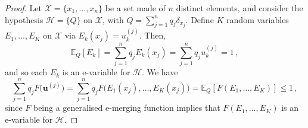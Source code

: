 \documentclass[10pt,a4paper]{amsart}
\newcommand{\E}{\mathbb E}
\newcommand{\Hh}{\mathcal H}
\newcommand{\X}{\mathcal X}
\begin{document}
\begin{proof}
    Let $\X = \{x_1,\dots, x_n\}$ be a  set made of $n$ distinct elements, and consider the hypothesis $\Hh = \{Q\}$ on $\X$, with $Q = \sum_{j=1}^n q_j \delta_{x_j}$. Define $K$ random variables $E_1,\dots, E_K$ on $\X$ via $E_k(x_j) = u^{(j)}_k$. Then, 
    $$\E_Q[E_k] = \sum_{j=1}^n q_j E_k(x_j) = \sum_{j=1}^n q_j u^{(j)}_k = 1\,,$$ and so each $E_k$ is an e-variable for $\Hh$. We have
    $$\sum_{j=1}^n q_j F\big(\mathbf{u}^{(j)}\big) = \sum_{j=1}^n q_j F\big(E_1(x_j),\dots, E_K(x_j)\big) = \E_Q[F(E_1,\dots, E_K)] \leq1\,,$$ since $F$ being a generalised e-merging function implies that $F(E_1,\dots, E_K)$ is an e-variable for $\Hh$.
\end{proof}
\end{document}
